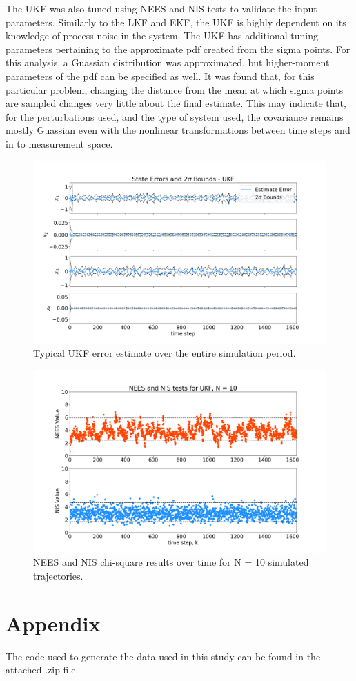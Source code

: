 \documentclass[11pt, a4paper]{article}
\begin{document}
The UKF was also tuned using NEES and NIS tests to validate the input parameters. 
Similarly to the LKF and EKF, the UKF is highly dependent on its knowledge of process noise in the system. 
The UKF has additional tuning parameters pertaining to the approximate pdf created from the sigma points. For this analysis, a Guassian distribution was approximated, but higher-moment parameters of the pdf can be specified as well. 
It was found that, for this particular problem, changing the distance from the mean at which sigma points are sampled changes very little about the final estimate. 
This may indicate that, for the perturbations used, and the type of system used, the covariance remains mostly Guassian even with the nonlinear transformations between time steps and in to measurement space.   


\begin{figure}[H]
	\centering
	\includegraphics[width=\textwidth]{Figures/ukf_estimate_th.png}
	\caption{Typical UKF error estimate over the entire simulation period.}
	\label{fig:ukf_est}
\end{figure}

\begin{figure}[H]
	\centering
	\includegraphics[width=\textwidth]{./Figures/NEESNIS_ukf_N10Q1.0E-09.png}
	\caption{NEES and NIS chi-square results over time for N = 10 simulated trajectories.}
	\label{fig:neesnis_ukf}
\end{figure}


\newpage
\section*{Appendix}
%
The code used to generate the data used in this study can be found in the attached .zip file.
\end{document}
